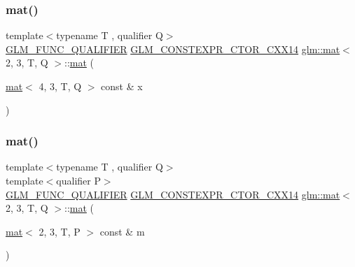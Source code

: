 \mbox{\label{structglm_1_1mat_3_012_00_013_00_01_t_00_01_q_01_4_a4c586529d0cf49309afb4ec2bbcb27f2}} 
\subsubsection{\texorpdfstring{mat()}{mat()}\hspace{0.1cm}{\footnotesize\ttfamily [17/21]}}
{\footnotesize\ttfamily template$<$typename T , qualifier Q$>$ \\
\mbox{\hyperlink{setup_8hpp_a33fdea6f91c5f834105f7415e2a64407}{G\+L\+M\+\_\+\+F\+U\+N\+C\+\_\+\+Q\+U\+A\+L\+I\+F\+I\+ER}} \mbox{\hyperlink{setup_8hpp_a0900f9145e68bf6061b6f5e7be3fa751}{G\+L\+M\+\_\+\+C\+O\+N\+S\+T\+E\+X\+P\+R\+\_\+\+C\+T\+O\+R\+\_\+\+C\+X\+X14}} \mbox{\hyperlink{structglm_1_1mat}{glm\+::mat}}$<$ 2, 3, T, Q $>$\+::\mbox{\hyperlink{structglm_1_1mat}{mat}} (\begin{DoxyParamCaption}\item[{\mbox{\hyperlink{structglm_1_1mat}{mat}}$<$ 4, 3, T, Q $>$ const \&}]{x }\end{DoxyParamCaption})}

\mbox{\label{structglm_1_1mat_3_012_00_013_00_01_t_00_01_q_01_4_a54292d5f34dca47737a3037100d133cb}} 
\subsubsection{\texorpdfstring{mat()}{mat()}\hspace{0.1cm}{\footnotesize\ttfamily [18/21]}}
{\footnotesize\ttfamily template$<$typename T , qualifier Q$>$ \\
template$<$qualifier P$>$ \\
\mbox{\hyperlink{setup_8hpp_a33fdea6f91c5f834105f7415e2a64407}{G\+L\+M\+\_\+\+F\+U\+N\+C\+\_\+\+Q\+U\+A\+L\+I\+F\+I\+ER}} \mbox{\hyperlink{setup_8hpp_a0900f9145e68bf6061b6f5e7be3fa751}{G\+L\+M\+\_\+\+C\+O\+N\+S\+T\+E\+X\+P\+R\+\_\+\+C\+T\+O\+R\+\_\+\+C\+X\+X14}} \mbox{\hyperlink{structglm_1_1mat}{glm\+::mat}}$<$ 2, 3, T, Q $>$\+::\mbox{\hyperlink{structglm_1_1mat}{mat}} (\begin{DoxyParamCaption}\item[{\mbox{\hyperlink{structglm_1_1mat}{mat}}$<$ 2, 3, T, P $>$ const \&}]{m }\end{DoxyParamCaption})}



